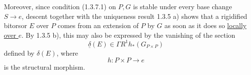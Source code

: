 Moreover, since condition (1.3.7.1) on $P,G$ is stable under every base
change $S\longrightarrow e$, descent together with the uniqueness
result 1.3.5 a) shows that a rigidified bitorsor $E$ over $P$ comes from
an extension of $P$ by $G$ as soon as it does so \underline{locally over
$e$}. By 1.3.5 b), this may also be expressed by the vanishing of the
section
\begin{equation*}
 \underline{\delta}(E)\in\Gamma R^1h_*(G_{P\times P})
\end{equation*}
defined by $\delta(E)$, where
\begin{equation*}
 h:P\times P\longrightarrow e
\end{equation*}
is the structural morphism.

